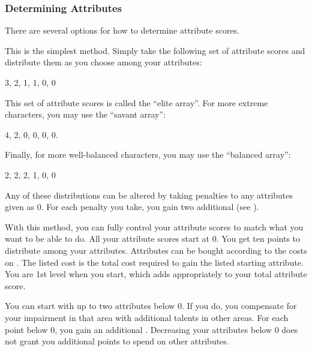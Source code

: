         \subsubsection{Determining Attributes}
            There are several options for how to determine attribute scores.

             This is the simplest method.
            Simply take the following set of attribute scores and distribute them as you choose among your attributes:

            3, 2, 1, 1, 0, 0

            This set of attribute scores is called the ``elite array''.
            For more extreme characters, you may use the ``savant array'':

            4, 2, 0, 0, 0, 0.

            Finally, for more well-balanced characters, you may use the ``balanced array'':

            2, 2, 2, 1, 0, 0

            Any of these distributions can be altered by taking penalties to any attributes given as 0.
            For each penalty you take, you gain two additional  (see ).

                With this method, you can fully control your attribute scores to match what you want to be able to do.
                All your attribute scores start at 0.
                You get ten points to distribute among your attributes.
                Attributes can be bought according to the costs on .
                The listed cost is the total cost required to gain the listed starting attribute.
                You are 1st level when you start, which adds appropriately to your total attribute score.

                \label{Impaired Attributes}
                You can start with up to two attributes below 0.
                If you do, you compensate for your impairment in that area with additional talents in other areas.
                For each point below 0, you gain an additional .
                Decreasing your attributes below 0 does not grant you additional points to spend on other attributes.

